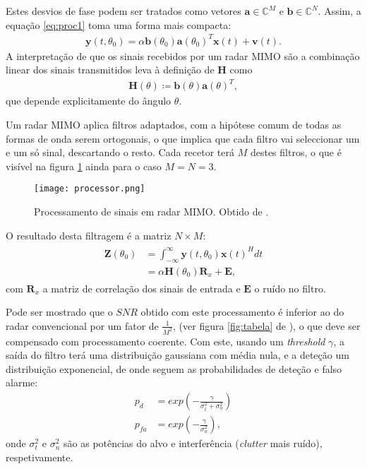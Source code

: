 \documentclass[purist,portuguese]{ist-report}
\begin{document}
Estes desvios de fase podem ser tratados como vetores $\mathbf{a} \in \mathbb{C}^M$ e $\mathbf{b} \in \mathbb{C}^N$.
Assim, a equação \ref{eq:proc1} toma uma forma mais compacta:
\begin{align}
  \mathbf{y}(t,\theta_0) = \alpha\mathbf{b}(\theta_0)\mathbf{a}(\theta_0)^T\mathbf{x}(t)+\mathbf{v}(t).
  \label{eq:radc}
\end{align}
A interpretação de que os sinais recebidos por um radar MIMO são a combinação linear dos sinais transmitidos leva à definição de $\mathbf{H}$ como
\begin{align}
  \mathbf{H}(\theta) \coloneqq \mathbf{b}(\theta)\mathbf{a}(\theta)^T,
  \label{eq:H}
\end{align}
que depende explicitamente do ângulo $\theta$.

Um radar MIMO aplica filtros adaptados, com a hipótese comum de todas as formas de onda serem ortogonais, o que implica que cada filtro vai seleccionar um e um só sinal, descartando o resto.
Cada recetor terá $M$ destes filtros, o que é visível na figura \ref{fig:proc} ainda para o caso $M=N=3$.

\begin{figure}[ht]
  \centering
  \texttt{[image: processor.png]}
  \caption{Processamento de sinais em radar MIMO. Obtido de \cite{davis2015mimo}.}
  \label{fig:proc}
\end{figure}

O resultado desta filtragem é a matriz $N\times M$:
\begin{align}
  \begin{aligned}
    \mathbf{Z}(\theta_0) &= \int_{-\infty}^{\infty} \mathbf{y}(t,\theta_0)\mathbf{x}(t)^Hdt \\
	&= \alpha \mathbf{H}(\theta_0)\mathbf{R}_x + \mathbf{E} ,
  \end{aligned}
  \label{eq:Z}
\end{align}
com $\mathbf{R}_x$ a matriz de correlação dos sinais de entrada e $\mathbf{E}$ o ruído no filtro.

Pode ser mostrado que o $SNR$ obtido com este processamento é inferior ao do radar convencional por um fator de $\frac{1}{M^2}$, (ver figura \ref{fig:tabela} de \cite{mimoradarbook}), o que deve ser compensado com processamento coerente.
Com este, usando um \textit{threshold} $\gamma$, a saída do filtro terá uma distribuição gaussiana com média nula, e a deteção um distribuição exponencial, de onde seguem as probabilidades de deteção e falso alarme:
\begin{align}
  p_d &= exp\left( -\frac{\gamma}{\sigma_t^2 + \sigma_n^2} \right) \label{eq:pd} \\
  p_{fa} &= exp\left( -\frac{\gamma}{\sigma_n^2} \right) \label{eq:pfa},
\end{align}
onde $\sigma_t^2$ e $\sigma_n^2$ são as potências do alvo e interferência (\textit{clutter} mais ruído), respetivamente.
\end{document}
